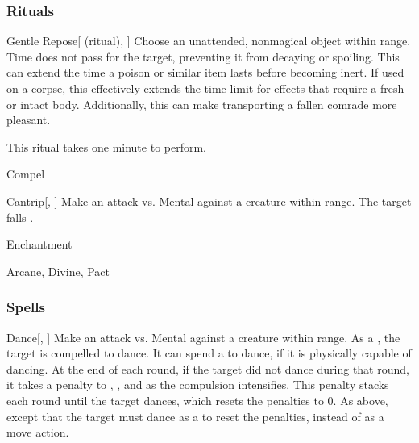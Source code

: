 \subsubsection{Rituals}


\begin{ability}[\nth{2}]{Gentle Repose}[ (ritual), ]
Choose an unattended, nonmagical object within \rngclose range.
Time does not pass for the target, preventing it from decaying or spoiling.
This can extend the time a poison or similar item lasts before becoming inert.
If used on a corpse, this effectively extends the time limit for effects that require a fresh or intact body.
Additionally, this can make transporting a fallen comrade more pleasant.


This ritual takes one minute to perform.
\end{ability}
\vspace{0.25em}


\newpage
\begin{spellsection}{Compel}

\begin{spellheader}
\end{spellheader}


\begin{ability}{Cantrip}[, ]
Make an attack vs. Mental against a creature within \rngmed range.
\hit The target falls .
\end{ability}




 Enchantment

 Arcane, Divine, Pact
\end{spellsection}


\subsubsection{Spells}


\begin{ability}[\nth{1}]{Dance}[, ]
Make an attack vs. Mental against a creature within \rngmed range.
\hit As a , the target is compelled to dance.
It can spend a  to dance, if it is physically capable of dancing.
At the end of each round, if the target did not dance during that round, it takes a  penalty to , , and  as the compulsion intensifies.
This penalty stacks each round until the target dances, which resets the penalties to 0.
\crit As above, except that the target must dance as a  to reset the penalties, instead of as a move action.
\end{ability}
\vspace{0.25em}



